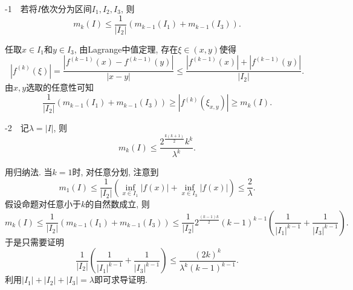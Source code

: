-1~~若将$I$依次分为区间$I_1,I_2,I_3$, 则$$m_k(I) \leq \frac{1}{|I_2|} (m_{k-1}(I_1) + m_{k-1}(I_3)). $$
\begin{exsolution}
	任取$x \in I_1$和$y \in I_3$, 由Lagrange中值定理, 存在$\xi \in (x,y)$使得$$|f^{(k)}(\xi)| = \frac{|f^{(k-1)}(x)-f^{(k-1)}(y)|}{|x-y|} \leq \frac{|f^{(k-1)}(x)|+|f^{(k-1)}(y)|}{|I_2|}. $$
	由$x,y$选取的任意性可知$$\frac{1}{|I_2|} (m_{k-1}(I_1) + m_{k-1}(I_3)) \geq |f^{(k)}(\xi _{x,y})| \geq m_k(I). $$
\end{exsolution}

-2~~记$\lambda = |I|$, 则$$m_k(I) \leq \frac{2^{\frac{k(k+1)}{2}} k^k}{\lambda ^k}. $$
\begin{exsolution}
	用归纳法. 当$k=1$时, 对任意分划, 注意到$$m_1(I) \leq \frac{1}{|I_2|} (\inf_{x \in I_1} |f(x)| + \inf_{x \in I_3} |f(x)|) \leq \frac{2}{\lambda}. $$
	假设命题对任意小于$k$的自然数成立, 则$$m_k(I) \leq \frac{1}{|I_2|} (m_{k-1}(I_1)+m_{k-1}(I_3)) \leq \frac{1}{|I_2|} 2^{ \frac{(k-1)k}{2} }(k-1)^{k-1} \left( \frac{1}{|I_1|^{k-1}} + \frac{1}{|I_3|^{k-1}}  \right). $$
	于是只需要证明$$\frac{1}{|I_2|} \left( \frac{1}{|I_1|^{k-1}} + \frac{1}{|I_3|^{k-1}} \right) \leq \frac{(2k)^k}{\lambda ^k(k-1)^{k-1}}. $$
	利用$|I_1|+|I_2|+|I_3|=\lambda$即可求导证明. 
\end{exsolution}

